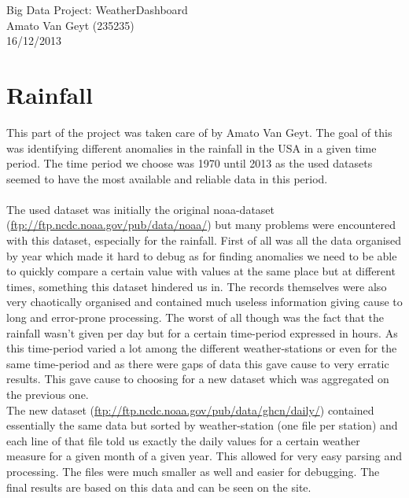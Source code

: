 
\begin{center}
{\LARGE Big Data Project: WeatherDashboard} \vspace{0.5cm} \\
{\large Amato Van Geyt (235235)}  \vspace{0.5cm}
\\
16/12/2013
\end{center}

\section{Rainfall}
This part of the project was taken care of by Amato Van Geyt. The goal of this was identifying different anomalies in the rainfall in the USA in a given time period. The time period we choose was 1970 until 2013 as the used datasets seemed to have the most available and reliable data in this period. \\ \\
The used dataset was initially the original noaa-dataset (\url{ftp://ftp.ncdc.noaa.gov/pub/data/noaa/}) but many problems were encountered with this dataset, especially for the rainfall. First of all was all the data organised by year which made it hard to debug as for finding anomalies we need to be able to quickly compare a certain value with values at the same place but at different times, something this dataset hindered us in. The records themselves were also very chaotically organised and contained much useless information giving cause to long and error-prone processing. The worst of all though was the fact that the rainfall wasn't given per day but for a certain time-period expressed in hours. As this time-period varied a lot among the different weather-stations or even for the same time-period and as there were gaps of data this gave cause to very erratic results. This gave cause to choosing for a new dataset which was aggregated on the previous one. \\ 
The new dataset (\url{ftp://ftp.ncdc.noaa.gov/pub/data/ghcn/daily/}) contained essentially the same data but sorted by weather-station (one file per station) and each line of that file told us exactly the daily values for a certain weather measure for a given month of a given year. This allowed for very easy parsing and processing. The files were much smaller as well and easier for debugging. The final results are based on this data and can be seen on the site.\\ 

